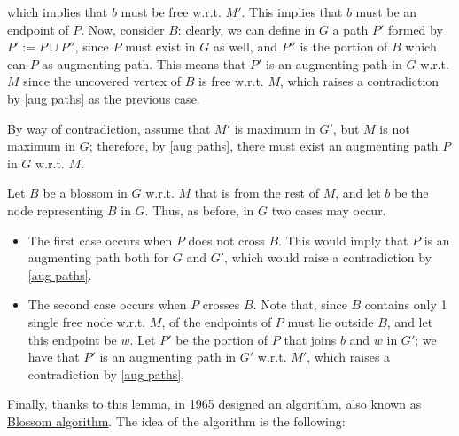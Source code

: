\documentclass[a4paper, 12pt]{report}
\begin{document}
{\begin{itemize}
        which implies that $b$ must be free w.r.t. $M'$. This implies that $b$ must be an endpoint of $P$. Now, consider $B$: clearly, we can define in $G$ a path $P'$ formed by $P' := P \cup P''$, since $P$ must exist in $G$ as well, and $P''$ is the portion of $B$ which can  $P$ as augmenting path. This means that $P'$ is an augmenting path in $G$ w.r.t. $M$ since the uncovered vertex of $B$ is free w.r.t. $M$, which raises a contradiction by \cref{aug paths} as the previous case. \end{itemize}
    }{
        By way of contradiction, assume that $M'$ is maximum in $G'$, but $M$  is not maximum in $G$; therefore, by \cref{aug paths}, there must exist an augmenting path $P$ in $G$ w.r.t. $M$.

        Let $B$ be a blossom in $G$ w.r.t. $M$ that is  from the rest of $M$, and let $b$ be the node representing $B$ in $G$. Thus, as before, in $G$ two cases may occur.

        \begin{itemize}
            \item The first case occurs when $P$ does not cross $B$. This would imply that $P$ is an augmenting path both for $G$ and $G'$, which would raise a contradiction by \cref{aug paths}.
            \item The second case occurs when $P$ crosses $B$. Note that, since $B$ contains only 1 single free node w.r.t. $M$,  of the endpoints of $P$ must lie outside $B$, and let this endpoint be $w$. Let $P'$ be the portion of $P$ that joins $b$ and $w$ in $G'$; we have that $P'$ is an augmenting path in $G'$ w.r.t. $M'$, which raises a contradiction by \cref{aug paths}.
        \end{itemize}
    }

    Finally, thanks to this lemma, in 1965 \textcite{edmonds} designed an algorithm, also known as \href{https://en.wikipedia.org/wiki/Blossom_algorithm}{Blossom algorithm}. The idea of the algorithm is the following:
\end{document}
